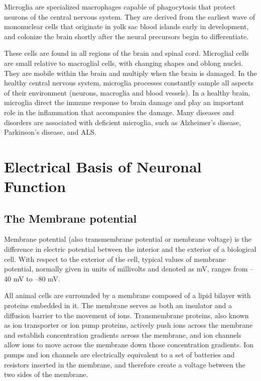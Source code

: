 Microglia are specialized macrophages capable of phagocytosis that protect neurons of the central nervous system. They are derived from the earliest wave of mononuclear cells that originate in yolk sac blood islands early in development, and colonize the brain shortly after the neural precursors begin to differentiate.

These cells are found in all regions of the brain and spinal cord. Microglial cells are small relative to macroglial cells, with changing shapes and oblong nuclei. They are mobile within the brain and multiply when the brain is damaged. In the healthy central nervous system, microglia processes constantly sample all aspects of their environment (neurons, macroglia and blood vessels). In a healthy brain, microglia direct the immune response to brain damage and play an important role in the inflammation that accompanies the damage. Many diseases and disorders are associated with deficient microglia, such as Alzheimer's disease, Parkinson's disease, and ALS.

\hypertarget{electrical-basis-of-neuronal-function}{%
\chapter{Electrical Basis of Neuronal Function}\label{electrical-basis-of-neuronal-function}}

\hypertarget{the-membrane-potential}{%
\section{The Membrane potential}\label{the-membrane-potential}}

Membrane potential (also transmembrane potential or membrane voltage) is the difference in electric potential between the interior and the exterior of a biological cell. With respect to the exterior of the cell, typical values of membrane potential, normally given in units of millivolts and denoted as mV, ranges from --40 mV to --80 mV.

All animal cells are surrounded by a membrane composed of a lipid bilayer with proteins embedded in it. The membrane serves as both an insulator and a diffusion barrier to the movement of ions. Transmembrane proteins, also known as ion transporter or ion pump proteins, actively push ions across the membrane and establish concentration gradients across the membrane, and ion channels allow ions to move across the membrane down those concentration gradients. Ion pumps and ion channels are electrically equivalent to a set of batteries and resistors inserted in the membrane, and therefore create a voltage between the two sides of the membrane.

